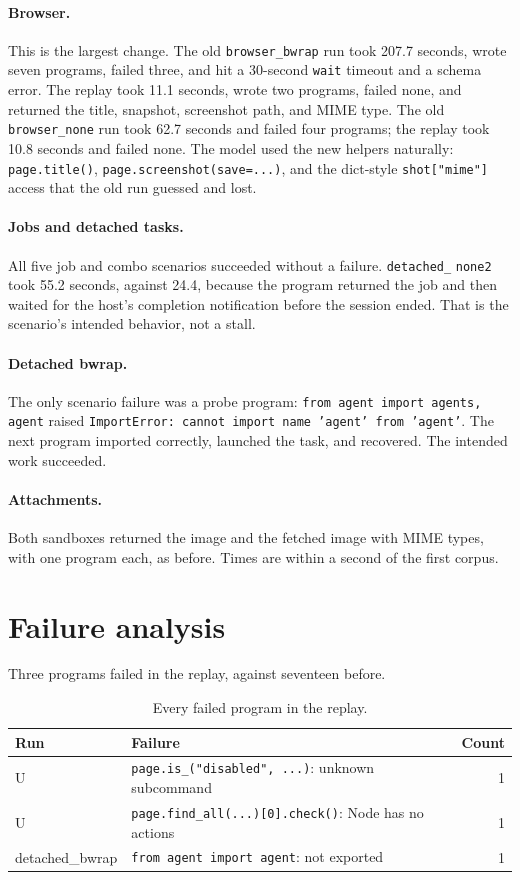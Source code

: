 \documentclass[11pt]{article}
\newcommand{\code}[1]{\texttt{#1}}
\begin{document}
\paragraph{Browser.}
This is the largest change. The old \code{browser\_bwrap} run took 207.7 seconds,
wrote seven programs, failed three, and hit a 30-second \code{wait} timeout and a
schema error. The replay took 11.1 seconds, wrote two programs, failed none, and
returned the title, snapshot, screenshot path, and MIME type. The old
\code{browser\_none} run took 62.7 seconds and failed four programs; the replay
took 10.8 seconds and failed none. The model used the new helpers naturally:
\code{page.title()}, \code{page.screenshot(save=...)}, and the dict-style
\code{shot["mime"]} access that the old run guessed and lost.

\paragraph{Jobs and detached tasks.}
All five job and combo scenarios succeeded without a failure. \code{detached\_}
\code{none2} took 55.2 seconds, against 24.4, because the program returned the
job and then waited for the host's completion notification before the session
ended. That is the scenario's intended behavior, not a stall.

\paragraph{Detached bwrap.}
The only scenario failure was a probe program:
\code{from agent import agents, agent} raised
\code{ImportError: cannot import name 'agent' from 'agent'}. The next program
imported correctly, launched the task, and recovered. The intended work
succeeded.

\paragraph{Attachments.}
Both sandboxes returned the image and the fetched image with MIME types, with
one program each, as before. Times are within a second of the first corpus.

\section{Failure analysis}
\label{sec:fail}

Three programs failed in the replay, against seventeen before.

\begin{table}[h]
\centering
\small
\begin{tabular}{@{}llr@{}}
\toprule
Run & Failure & Count \\
\midrule
U & \code{page.is\_("disabled", ...)}: unknown subcommand & 1 \\
U & \code{page.find\_all(...)[0].check()}: Node has no actions & 1 \\
detached\_bwrap & \code{from agent import agent}: not exported & 1 \\
\bottomrule
\end{tabular}
\caption{Every failed program in the replay.}
\end{table}
\end{document}
